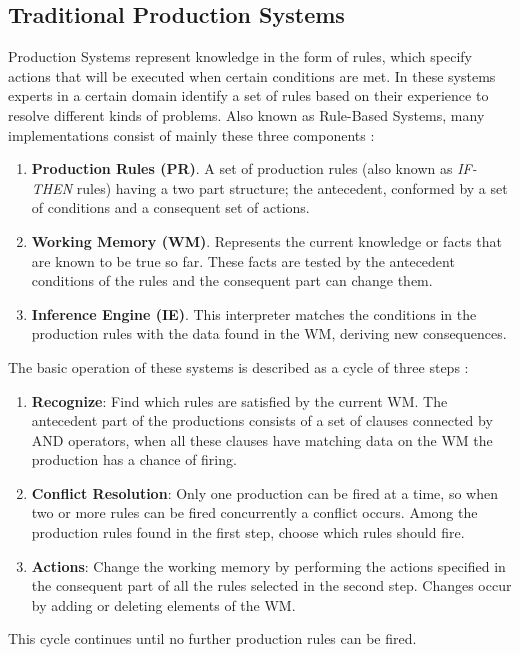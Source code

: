 \subsection{Traditional Production Systems}
Production Systems represent knowledge in the form of rules, which 
specify actions that will be executed when certain conditions are met. 
In these systems experts in a certain domain identify a set of rules 
based on their experience to  resolve different kinds of problems. 
Also known as Rule-Based Systems, many implementations consist 
of mainly these three components  
\cite{brachman1992knowledge}  \cite{konar2006computational}:
\begin{enumerate}   
\item \textbf{Production Rules (PR)}. A set of
production rules (also known as \textit{IF-THEN} rules) having a two part
structure; the antecedent, conformed by a set of conditions and a
consequent set of actions. 
\item \textbf{Working Memory (WM)}.
Represents the current knowledge or facts that are known to be true so
far. These facts are tested by the antecedent conditions of the rules
and the consequent part can change them. 
\item \textbf{Inference Engine (IE)}. 
This interpreter matches the conditions in the
production rules with the data found in the WM,
deriving new consequences.
\end{enumerate}
The basic operation of these systems is described as a cycle of 
three steps  \cite{brachman1992knowledge}:
\begin{enumerate}
\item \textbf{Recognize}: Find which rules are satisfied by 
the current WM. The antecedent part of the productions consists 
of a set of clauses connected by AND operators, when all these 
clauses have matching data on the WM the production has a chance 
of firing.
\item \textbf{Conflict Resolution}: Only one production can be 
fired at a time, so when two or more rules can be fired concurrently 
a conflict occurs. Among the production rules found in the first 
step, choose which rules should fire.
\item \textbf{Actions}: Change the working memory by performing 
the actions specified in the consequent part of all the rules 
selected in the second step. Changes occur by adding or 
deleting elements of the WM.
\end{enumerate}
This cycle continues until no further production rules can be fired.

